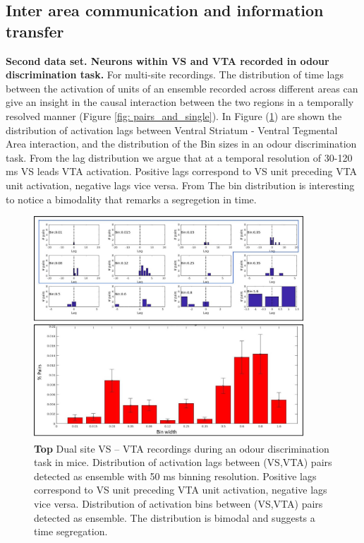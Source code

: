 \documentclass{article}
\begin{document}
\subsection{Inter area communication and information transfer}
\textbf{Second data set. Neurons within VS and VTA recorded in odour discrimination task.}
For multi-site recordings. The distribution of time lags between the activation of units of an
ensemble recorded across different areas can give an insight in the causal interaction
between the two regions in a temporally resolved manner (Figure \ref{fig: pairs_and_single}).
In Figure (\ref{fig: LagBinDistr}) are shown the distribution of activation lags between Ventral Striatum - Ventral Tegmental Area interaction,  and the distribution of the Bin sizes in an odour discrimination task. From the lag distribution we argue that at a temporal resolution of 30-120 ms VS leads VTA activation. Positive lags correspond to VS unit preceding VTA unit activation, negative lags vice versa.
From The bin distribution is interesting to notice a bimodality that remarks a segregetion in time.
\begin{figure}
    \centering
    \includegraphics[width=0.9\textwidth]{LagBinDistr}
    \caption{\footnotesize{\textbf{Top} Dual site VS – VTA recordings during an odour discrimination task in mice. Distribution of activation lags between
(VS,VTA) pairs detected as ensemble with 50 ms binning resolution. Positive lags correspond to VS unit preceding VTA unit activation, negative lags vice versa. Distribution of activation bins between (VS,VTA) pairs detected as ensemble. The distribution is bimodal and suggests a time segregation.}}
    \label{fig: LagBinDistr}
\end{figure}
\end{document}

